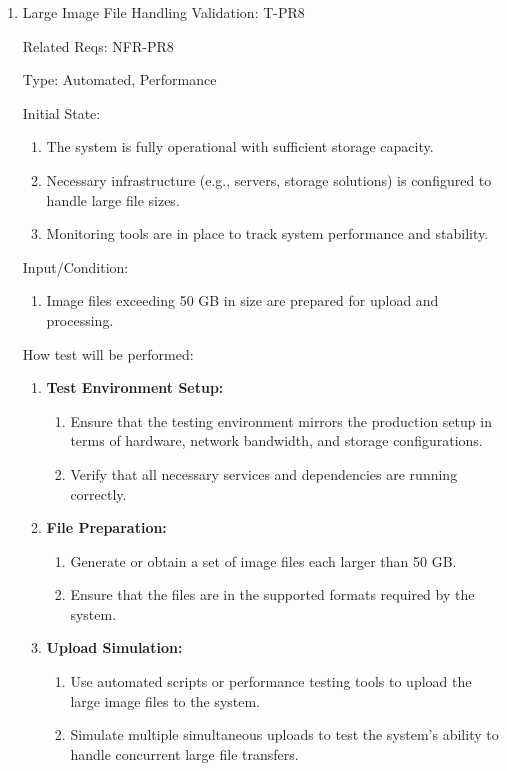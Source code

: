 \documentclass[12pt, titlepage]{article}
\begin{document}
\begin{enumerate}

\item{Large Image File Handling Validation: T-PR8\\}

Related Reqs: NFR-PR8

Type: Automated, Performance

Initial State:
\begin{enumerate}
    \item The system is fully operational with sufficient storage capacity.
    \item Necessary infrastructure (e.g., servers, storage solutions) is configured to handle large file sizes.
    \item Monitoring tools are in place to track system performance and stability.
\end{enumerate}
Input/Condition:
\begin{enumerate}
    \item Image files exceeding 50 GB in size are prepared for upload and processing.
\end{enumerate}
How test will be performed:
\begin{enumerate}
    \item \textbf{Test Environment Setup:}
    \begin{enumerate}
        \item Ensure that the testing environment mirrors the production setup in terms of hardware, network bandwidth, and storage configurations.
        \item Verify that all necessary services and dependencies are running correctly.
    \end{enumerate}
    
    \item \textbf{File Preparation:}
    \begin{enumerate}
        \item Generate or obtain a set of image files each larger than 50 GB.
        \item Ensure that the files are in the supported formats required by the system.
    \end{enumerate}
    
    \item \textbf{Upload Simulation:}
    \begin{enumerate}
        \item Use automated scripts or performance testing tools to upload the large image files to the system.
        \item Simulate multiple simultaneous uploads to test the system's ability to handle concurrent large file transfers.
    \end{enumerate}
    

\end{enumerate}
\end{enumerate}
\end{document}
